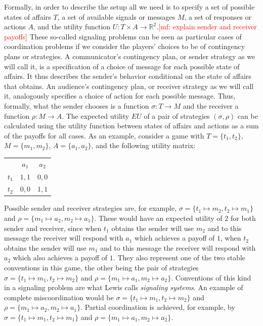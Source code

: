 \documentclass[a4paper]{article}
\newcommand{\mf}[1]{\textcolor{Red}{[mf: #1]}}
\begin{document}
Formally, in order to describe the setup all we need is to specify a set of possible states of affairs $T$, a set of available signals or messages $M$, a set of responses or actions $A$, and the utility function $U : T \times A \rightarrow \mathbb{R}^2$.\mf{explain sender and receiver
payoffs}
These so-called signaling problems can be seen as particular cases of coordination problems if we consider the players' choices to be of contingency plans or strategies.
A communicator's contingency plan, or sender strategy as we will call it, is a specification of a choice of message for each possible state of affairs.
It thus describes the sender's behavior conditional on the state of affairs that obtains.
An audience's contingency plan, or receiver strategy as we will call it, analogously specifies a choice of action for each possible message.
Thus, formally, what the sender chooses is a function $\sigma : T \rightarrow M$ and the receiver a function $\rho : M \rightarrow A$.
The expected utility $EU$ of a pair of strategies $(\sigma,\rho)$ can be calculated using the utility function between states of affairs and actions as a sum of the payoffs for all cases. %
As an example, consider a game with $T = \lbrace t_1, t_2 \rbrace$, $M = \lbrace m_1, m_2 \rbrace$, $A = \lbrace a_1, a_2 \rbrace$, and the following utility matrix:
\begin{center}
\begin{tabular}{r|c|c|}
\multicolumn{1}{r}{}
 & \multicolumn{1}{c}{$a_1$}
 & \multicolumn{1}{c}{$a_2$} \\ \cline{2-3}
   $t_1$ & $1,1$ & $0,0$ \\ \cline{2-3}
   $t_2$ & $0,0$ & $1,1$ \\ \cline{2-3}
\end{tabular}
\end{center}
Possible sender and receiver strategies are, for example, $\sigma = \lbrace t_1 \mapsto m_2, t_2 \mapsto m_1 \rbrace$ and $\rho = \lbrace m_1 \mapsto a_2, m_2 \mapsto a_1 \rbrace$.
These would have an expected utility of $2$ for both sender and receiver, since when $t_1$ obtains the sender will use $m_2$ and to this message the receiver will respond with $a_1$ which achieves a payoff of $1$, when $t_2$ obtains the sender will use $m_1$ and to this message the receiver will respond with $a_2$ which also achieves a payoff of $1$.
They also represent one of the two stable conventions in this game, the other being the pair of strategies $\sigma = \lbrace t_1 \mapsto m_1, t_2 \mapsto m_2 \rbrace$ and $\rho = \lbrace m_1 \mapsto a_1, m_2 \mapsto a_2 \rbrace$.
Conventions of this kind in a signaling problem are what Lewis calls \emph{signaling systems}.
An example of complete miscoordination would be $\sigma = \lbrace t_1 \mapsto m_1, t_2 \mapsto m_2 \rbrace$ and $\rho = \lbrace m_1 \mapsto a_2, m_2 \mapsto a_1 \rbrace$.
Partial coordination is achieved, for example, by $\sigma = \lbrace t_1 \mapsto m_1, t_2 \mapsto m_1 \rbrace$ and $\rho = \lbrace m_1 \mapsto a_1, m_2 \mapsto a_2 \rbrace$.
\end{document}
